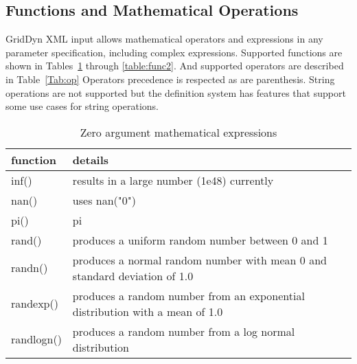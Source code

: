 \documentclass[12pt]{article} %
\begin{document}
\subsection{Functions and Mathematical Operations} \label{sec:func}
GridDyn XML input allows mathematical operators and expressions in any parameter specification, including complex expressions.  Supported functions are shown in Tables~\ref{table:func0} through \ref{table:func2}. And supported operators are described in Table~\ref{Tab:op}  Operators precedence is respected as are parenthesis.   String operations are not supported but the definition system has features that support some use cases for string operations.
\begin{table}[ht]

    \caption{Zero argument mathematical expressions} %
    \centering %
    \begin{tabular}{l p{11cm}} %
        \hline %
        function & details \\ [0.5ex] %
        \hline %
    inf() & results in a large number (1e48) currently \\
    nan()& uses nan("0") \\
    pi() & pi \\
    rand() & produces a uniform random number between 0 and 1 \\
    randn() & produces a normal random number with mean 0 and standard deviation of 1.0 \\
    randexp() & produces a random number from an exponential distribution with a mean of 1.0 \\
    randlogn() & produces a random number from a log normal distribution \\
        \hline %
    \end{tabular}
    \label{table:func0}
\end{table}
\end{document}
